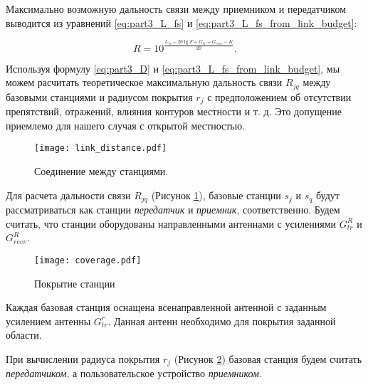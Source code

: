 





Максимально возможную дальность связи между приемником и передатчиком выводится из уравнений \cref{eq:part3_L_fs} и \cref{eq:part3_L_fs_from_link_budget}:

\begin{equation}
  \label{eq:part3_D}
  R = 10^\frac{L_{fs} - 20\lg{F} + G_{tr} + G_{recv} - K}{20}.
\end{equation}

Используя формулу \cref{eq:part3_D} и \cref{eq:part3_L_fs_from_link_budget}, мы можем расчитать теоретическое максимальную дальность связи $ R_{jq}$ между базовыми станциями и радиусом покрытия $ r_j $ с предположением об отсутствии препятствий, отражений, влияния контуров местности и т. д. Это допущение приемлемо для нашего случая с открытой местностью.

\begin{figure}[h!]
  \centering
   \texttt{[image: link\_distance.pdf]}
\caption{Соединение между станциями.}
\label{fig:part3_link_distance}
\end{figure}

Для расчета дальности связи $R_{jq}$ (Рисунок \cref{fig:part3_link_distance}), базовые станции $s_j$ и $s_q$ будут рассматриваться как станции \textit{передатчик} и \textit{приемник}, соответственно. Будем считать, что станции оборудованы направленными антеннами с усилениями $G_{tr}^{R}$ и $G_{recv}^{R}$.

\begin{figure}[h!]
  \centering
   \texttt{[image: coverage.pdf]}
\caption{Покрытие станции}
\label{fig:part3_coverage}
\end{figure}

Каждая базовая станция оснащена всенаправленной антенной с заданным усилением антенны $G_ {tr}^{r}$. Данная антенн необходимо для покрытия заданной области.


При вычислении радиуса покрытия $r_j$ (Рисунок  \cref{fig:part3_coverage}) базовая станция будем считать \textit{передатчиком}, а пользовательское устройство \textit{приемником}.

